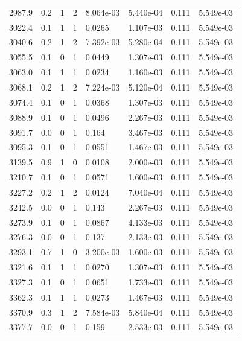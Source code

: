 \documentclass[preview]{standalone}
\begin{document}
{{{{{{\begin{tabular}{L{1.2cm}C{1.2cm} C{0.3cm}C{0.5cm} C{1.4cm}C{1.4cm} C{1.4cm}C{1.4cm}}
  2987.9  &   0.2  & 1     &  2 &  8.064e-03  & 5.440e-04  & 0.111 &  5.549e-03   \\ 
  3022.4  &   0.1  & 1     &  1 &  0.0265  & 1.107e-03  & 0.111 &  5.549e-03   \\ 
  3040.6  &   0.2  & 1     &  2 &  7.392e-03  & 5.280e-04  & 0.111 &  5.549e-03   \\ 
  3055.5  &   0.1  & 0     &  1 &  0.0449  & 1.307e-03  & 0.111 &  5.549e-03   \\ 
  3063.0  &   0.1  & 1     &  1 &  0.0234  & 1.160e-03  & 0.111 &  5.549e-03   \\ 
  3068.1  &   0.2  & 1     &  2 &  7.224e-03  & 5.120e-04  & 0.111 &  5.549e-03   \\ 
  3074.4  &   0.1  & 0     &  1 &  0.0368  & 1.307e-03  & 0.111 &  5.549e-03   \\ 
  3088.9  &   0.1  & 0     &  1 &  0.0496  & 2.267e-03  & 0.111 &  5.549e-03   \\ 
  3091.7  &   0.0  & 0     &  1 &  0.164  & 3.467e-03  & 0.111 &  5.549e-03   \\ 
  3095.3  &   0.1  & 0     &  1 &  0.0551  & 1.467e-03  & 0.111 &  5.549e-03   \\ 
  3139.5  &   0.9  & 1     &  0 &  0.0108  & 2.000e-03  & 0.111 &  5.549e-03   \\ 
  3210.7  &   0.1  & 0     &  1 &  0.0571  & 1.600e-03  & 0.111 &  5.549e-03   \\ 
  3227.2  &   0.2  & 1     &  2 &  0.0124  & 7.040e-04  & 0.111 &  5.549e-03   \\ 
  3242.5  &   0.0  & 0     &  1 &  0.143  & 2.267e-03  & 0.111 &  5.549e-03   \\ 
  3273.9  &   0.1  & 0     &  1 &  0.0867  & 4.133e-03  & 0.111 &  5.549e-03   \\ 
  3276.3  &   0.0  & 0     &  1 &  0.137  & 2.133e-03  & 0.111 &  5.549e-03   \\ 
  3293.1  &   0.7  & 1     &  0 &  3.200e-03  & 1.600e-03  & 0.111 &  5.549e-03   \\ 
  3321.6  &   0.1  & 1     &  1 &  0.0270  & 1.307e-03  & 0.111 &  5.549e-03   \\ 
  3327.3  &   0.1  & 0     &  1 &  0.0651  & 1.733e-03  & 0.111 &  5.549e-03   \\ 
  3362.3  &   0.1  & 1     &  1 &  0.0273  & 1.467e-03  & 0.111 &  5.549e-03   \\ 
  3370.9  &   0.3  & 1     &  2 &  7.584e-03  & 5.840e-04  & 0.111 &  5.549e-03   \\ 
  3377.7  &   0.0  & 0     &  1 &  0.159  & 2.533e-03  & 0.111 &  5.549e-03   \\ 

\end{tabular}}}}}}}
\end{document}
